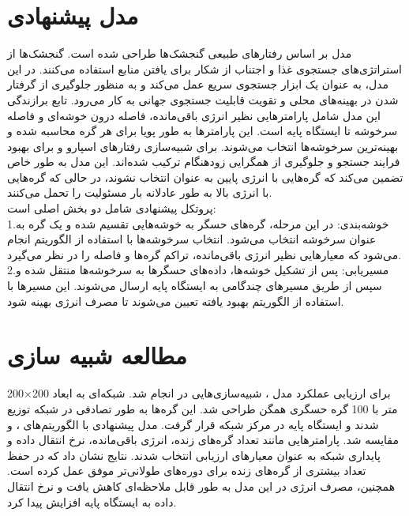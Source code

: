 \documentclass[11.5pt,onecolumn,a4paper]{article}
\begin{document}
	\section{مدل پیشنهادی}
\hspace*{2em}مدل  بر اساس رفتارهای طبیعی  گنجشک‌ها طراحی شده است. گنجشک‌ها از استراتژی‌های جستجوی غذا و اجتناب از شکار برای یافتن منابع استفاده می‌کنند. در این مدل،  به عنوان یک ابزار جستجوی سریع عمل می‌کند و  به منظور جلوگیری از گرفتار شدن در بهینه‌های محلی و تقویت قابلیت جستجوی جهانی به کار می‌رود. تابع برازندگی این مدل شامل پارامترهایی نظیر انرژی باقی‌مانده، فاصله درون خوشه‌ای و فاصله سرخوشه تا ایستگاه پایه است. این پارامترها به طور پویا برای هر گره محاسبه شده و بهینه‌ترین سرخوشه‌ها انتخاب می‌شوند.  برای شبیه‌سازی رفتارهای اسپارو و  برای بهبود فرایند جستجو و جلوگیری از همگرایی زودهنگام ترکیب شده‌اند. این مدل به طور خاص تضمین می‌کند که گره‌هایی با انرژی پایین به عنوان  انتخاب نشوند، در حالی که گره‌هایی با انرژی بالا به طور عادلانه بار مسئولیت را تحمل می‌کنند.\\
پروتکل پیشنهادی شامل دو بخش اصلی است:\\
\hspace*{1em}1.خوشه‌بندی: در این مرحله، گره‌های حسگر به خوشه‌هایی تقسیم شده و یک گره به عنوان سرخوشه انتخاب می‌شود. انتخاب سرخوشه‌ها با استفاده از الگوریتم  انجام می‌شود که معیارهایی نظیر انرژی باقی‌مانده، تراکم گره‌ها و فاصله را در نظر می‌گیرد.\\
\hspace*{1em}2.مسیریابی: پس از تشکیل خوشه‌ها، داده‌های حسگرها به سرخوشه‌ها منتقل شده و سپس از طریق مسیرهای چندگامی به ایستگاه پایه ارسال می‌شوند. این مسیرها با استفاده از الگوریتم بهبود یافته  تعیین می‌شوند تا مصرف انرژی بهینه شود.


	\section{مطالعه شبیه سازی}
	\hspace*{1em}برای ارزیابی عملکرد مدل ، شبیه‌سازی‌هایی در    انجام شد. شبکه‌ای به ابعاد 200×200 متر با 100 گره حسگری همگن طراحی شد. این گره‌ها به طور تصادفی در شبکه توزیع شدند و ایستگاه پایه در مرکز شبکه قرار گرفت. مدل پیشنهادی با الگوریتم‌های ،  و  مقایسه شد. پارامترهایی مانند تعداد گره‌های زنده، انرژی باقی‌مانده، نرخ انتقال داده و پایداری شبکه به عنوان معیارهای ارزیابی انتخاب شدند. نتایج نشان داد که  در حفظ تعداد بیشتری از گره‌های زنده برای دوره‌های طولانی‌تر موفق عمل کرده است. همچنین، مصرف انرژی در این مدل به طور قابل ملاحظه‌ای کاهش یافت و نرخ انتقال داده به ایستگاه پایه افزایش پیدا کرد.\\	
	
\end{document}
